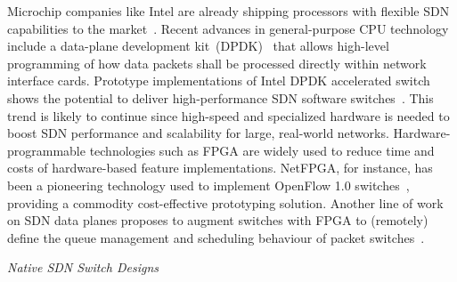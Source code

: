 Microchip companies like Intel are already shipping processors with flexible SDN capabilities to the 
market~\cite{intelprocessors2012}. Recent advances in general-purpose CPU technology include a
data-plane development kit~(DPDK)~\cite{intelcorporation2014} that allows high-level programming of how data 
packets shall be processed directly within network interface cards. Prototype implementations of Intel 
DPDK accelerated switch shows the potential to deliver high-performance SDN software switches~\cite{pongracz2013}. This trend is likely to 
continue since high-speed and specialized hardware is needed to boost SDN performance and scalability for 
large, real-world networks. Hardware-programmable technologies such as FPGA are widely used to reduce time 
and costs of hardware-based feature implementations. NetFPGA, for instance, has been a pioneering technology 
used to implement OpenFlow 1.0 switches~\cite{naous2008}, providing a commodity 
cost-effective prototyping solution. Another line of work on SDN data planes proposes to augment switches 
with FPGA to (remotely) define the queue management and scheduling behaviour of packet 	
switches~\cite{sivaraman2013}.

\vspace{2mm}
\noindent \textit{Native SDN Switch Designs}

